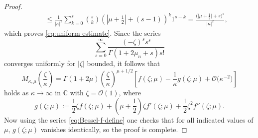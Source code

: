 \begin{proof}
\begin{gather*}
 \qquad\le \frac{1}{|\kappa|^2}\sum_{k=0}^s\binom{s}{k}\left(\left|\mu+\frac{1}{2}\right|+(s-1)\right)^k1^{s-k}=\frac{\big(\big|\mu+\frac{1}{2}\big|+s\big)^s}{|\kappa|^2},
\end{gather*}
which proves \eqref{eq:uniform-estimate}.
Since the series
\begin{equation*}%
 \sum_{s=0}^\infty \frac{(-\zeta)^ss^s}{\Gamma(1+2\mu_n+s)s!}
\end{equation*}
converges uniformly for $|\zeta|$ bounded, it follows that
\begin{equation*}%
 M_{\kappa,\mu}\left(\frac{\zeta}{\kappa}\right) = \Gamma(1+2\mu)\left(\frac{\zeta}{\kappa}\right)^{\mu+1/2}\left[f(\zeta;\mu) -\frac{1}{\kappa}g(\zeta;\mu) + \mathcal{O}\big(\kappa^{-2}\big)\right]
\end{equation*}
holds as $\kappa\to\infty$ in $\mathbb{C}$ with $\zeta=\mathcal{O}(1)$, where
\begin{equation*}%
 g(\zeta;\mu):=\frac{1}{2}\zeta f(\zeta;\mu)+\left(\mu+\frac{1}{2}\right)\zeta f'(\zeta;\mu) +\frac{1}{2}\zeta^2f''(\zeta;\mu).
\end{equation*}
Now using the series \eqref{eq:Bessel-f-define} one checks that for all indicated values of $\mu$, $g(\zeta;\mu)$ vanishes identically, so the proof is complete.
\end{proof}

